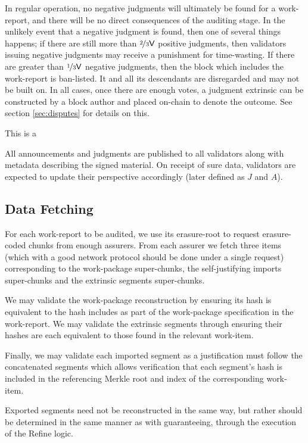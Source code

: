 In regular operation, no negative judgments will ultimately be found for a work-report, and there will be no direct consequences of the auditing stage. In the unlikely event that a negative judgment is found, then one of several things happens; if there are still more than $\nicefrac{2}{3}\mathsf{V}$ positive judgments, then validators issuing negative judgments may receive a punishment for time-wasting. If there are greater than $\nicefrac{1}{3}\mathsf{V}$ negative judgments, then the block which includes the work-report is ban-listed. It and all its descendants are disregarded and may not be built on. In all cases, once there are enough votes, a judgment extrinsic can be constructed by a block author and placed on-chain to denote the outcome. See section \ref{sec:disputes} for details on this.

This is a 

All announcements and judgments are published to all validators along with metadata describing the signed material. On receipt of sure data, validators are expected to update their perspective accordingly (later defined as $J$ and $A$).

\subsection{Data Fetching}

For each work-report to be audited, we use its erasure-root to request erasure-coded chunks from enough assurers. From each assurer we fetch three items (which with a good network protocol should be done under a single request) corresponding to the work-package super-chunks, the self-justifying imports super-chunks and the extrinsic segments super-chunks.

We may validate the work-package reconstruction by ensuring its hash is equivalent to the hash includes as part of the work-package specification in the work-report. We may validate the extrinsic segments through ensuring their hashes are each equivalent to those found in the relevant work-item.

Finally, we may validate each imported segment as a justification must follow the concatenated segments which allows verification that each segment's hash is included in the referencing Merkle root and index of the corresponding work-item.

Exported segments need not be reconstructed in the same way, but rather should be determined in the same manner as with guaranteeing, \ie through the execution of the Refine logic.

